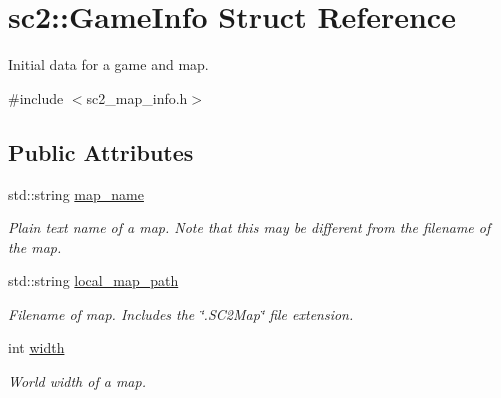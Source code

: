 \hypertarget{structsc2_1_1_game_info}{}\section{sc2\+:\+:Game\+Info Struct Reference}
\label{structsc2_1_1_game_info}


Initial data for a game and map.  




{\ttfamily \#include $<$sc2\+\_\+map\+\_\+info.\+h$>$}

\subsection*{Public Attributes}
\begin{DoxyCompactItemize}
\item 
\mbox{\label{structsc2_1_1_game_info_aac7b270ec70809ad1516d6eb232a6d50}} 
std\+::string \hyperlink{structsc2_1_1_game_info_aac7b270ec70809ad1516d6eb232a6d50}{map\+\_\+name}
\begin{DoxyCompactList}\small\item\em Plain text name of a map. Note that this may be different from the filename of the map. \end{DoxyCompactList}\item 
\mbox{\label{structsc2_1_1_game_info_ad40b7c438ccec00f09642ca3a298998b}} 
std\+::string \hyperlink{structsc2_1_1_game_info_ad40b7c438ccec00f09642ca3a298998b}{local\+\_\+map\+\_\+path}
\begin{DoxyCompactList}\small\item\em Filename of map. Includes the \char`\"{}.\+S\+C2\+Map\char`\"{} file extension. \end{DoxyCompactList}\item 
\mbox{\label{structsc2_1_1_game_info_a9b00972b55c4b963c79afe256919631f}} 
int \hyperlink{structsc2_1_1_game_info_a9b00972b55c4b963c79afe256919631f}{width}
\begin{DoxyCompactList}\small\item\em World width of a map. \end{DoxyCompactList}\item 
\mbox{\label{structsc2_1_1_game_info_a81e1a29b3074946432fff0d11ca6731f}} 

\end{DoxyCompactItemize}
